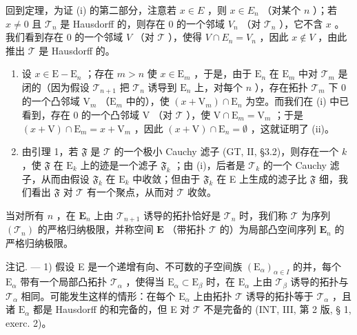 回到定理，为证 (i) 的第二部分，注意若 \(x \in E\) ，则 \(x \in E_n\) （对某个 \(n\) ）；若 \(x \neq 0\) 且 \(\mathcal{T}_n\) 是 Hausdorff 的，则存在 0 的一个邻域 \(V_n\) （对 \(\mathcal{T}_n\) ），它不含 \(x\) 。我们看到存在 0 的一个邻域 \(V\) （对 \(\mathcal{T}\) ），使得 \(V \cap E_n = V_n\) ，因此 \(x \notin V\) ，由此推出 \(\mathcal{T}\) 是 Hausdorff 的。

\begin{enumerate}
\def\labelenumi{(\roman{enumi})}
\setcounter{enumi}{1}
\item
  设 \(x \in \mathrm{E} - \mathrm{E}_n\) ；存在 \(m > n\) 使 \(x \in \mathrm{E}_m\) ，于是，由于 \(\mathrm{E}_n\) 在 \(\mathrm{E}_m\) 中对 \(\mathcal{T}_m\) 是闭的（因为假设 \(\mathcal{T}_{n+1}\) 把 \(\mathcal{T}_n\) 诱导到 \(\mathrm{E}_n\) 上，对每个 \(n\) ），存在拓扑 \(\mathcal{T}_m\) 下 0 的一个凸邻域 \(\mathrm{V}_m\) （\(\mathrm{E}_m\) 中的），使 \((x + \mathrm{V}_m) \cap \mathrm{E}_n\) 为空。而我们在 (i) 中已看到，存在 0 的一个凸邻域 \(\mathrm{V}\) （对 \(\mathcal{T}\) ），使 \(\mathrm{V} \cap \mathrm{E}_m = \mathrm{V}_m\) ；于是 \((x + \mathrm{V}) \cap \mathrm{E}_m = x + \mathrm{V}_m\) ，因此 \((x + \mathrm{V}) \cap \mathrm{E}_n = \emptyset\) ，这就证明了 (ii)。
\item
  由引理 1，若 \(\mathfrak{F}\) 是 \(\mathcal{T}\) 的一个极小 Cauchy 滤子 (GT, II, §3.2)，则存在一个 \(k\) ，使 \(\mathfrak{F}\) 在 \(\mathrm{E}_k\) 上的迹是一个滤子 \(\mathfrak{F}_k\) ；由 (i)，后者是 \(\mathcal{T}_k\) 的一个 Cauchy 滤子，从而由假设 \(\mathfrak{F}_k\) 在 \(\mathrm{E}_k\) 中收敛；但由于 \(\mathfrak{F}_k\) 在 E 上生成的滤子比 \(\mathfrak{F}\) 细，我们看出 \(\mathfrak{F}\) 对 \(\mathcal{T}\) 有一个聚点，从而对 \(\mathcal{T}\) 收敛。
\end{enumerate}

当对所有 \(n\) ，在 \(\mathbf{E}_n\) 上由 \(\mathcal{T}_{n+1}\) 诱导的拓扑恰好是 \(\mathcal{T}_n\) 时，我们称 \(\mathcal{T}\) 为序列 \((\mathcal{T}_n)\) 的严格归纳极限，并称空间 \(\mathbf{E}\) （带拓扑 \(\mathcal{T}\) 的）为局部凸空间序列 \(\mathbf{E}_n\) 的严格归纳极限。

注记. --- 1) 假设 E 是一个递增有向、不可数的子空间族 \((\mathrm{E}_{\alpha})_{\alpha \in I}\) 的并，每个 \(\mathrm{E}_{\alpha}\) 带有一个局部凸拓扑 \(\mathcal{T}_{\alpha}\) ，使得当 \(\mathrm{E}_{\alpha} \subset \mathrm{E}_{\beta}\) 时，在 \(\mathrm{E}_{\alpha}\) 上由 \(\mathcal{T}_{\beta}\) 诱导的拓扑与 \(\mathcal{T}_{\alpha}\) 相同。可能发生这样的情形：在每个 \(\mathrm{E}_{\alpha}\) 上由拓扑 \(\mathcal{T}\) 诱导的拓扑等于 \(\mathcal{T}_{\alpha}\) ，且诸 \(\mathrm{E}_{\alpha}\) 都是 Hausdorff 的和完备的，但 E 对 \(\mathcal{T}\) 不是完备的 (INT, III, 第 2 版, § 1, exerc. 2)。

